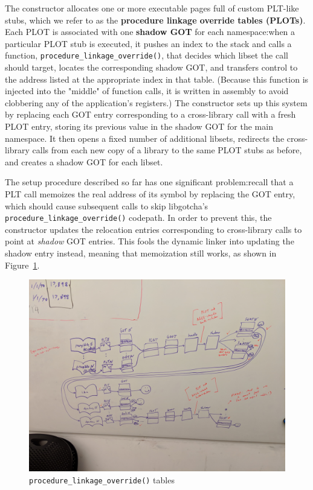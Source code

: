The constructor allocates one or more executable pages full of custom PLT-like
stubs, which we refer to as the \textbf{procedure linkage override tables (PLOTs)}.
Each PLOT is associated with one \textbf{shadow GOT} for each namespace:\@ when a
particular PLOT stub is executed, it pushes an index to the stack and calls a
function, \texttt{procedure\_linkage\_override()}, that decides which libset the call
should target, locates the corresponding shadow GOT, and transfers control to the
address listed at the appropriate index in that table.  (Because this function
is injected into the "middle" of function calls, it is written in assembly to avoid
clobbering any of the application's registers.)  The constructor sets up this system
by replacing each GOT entry corresponding to a cross-library call with a fresh PLOT
entry, storing its previous value in the shadow GOT for the main namespace.  It then
opens a fixed number of additional libsets, redirects the cross-library calls from
each new copy of a library to the same PLOT stubs as before, and creates a shadow GOT
for each libset.

The setup procedure described so far has one significant problem:\@ recall that a PLT
call memoizes the real address of its symbol by replacing the GOT entry, which should
cause subsequent calls to skip libgotcha's \texttt{procedure\_linkage\_override()}
codepath.  In order to prevent this, the constructor updates the relocation entries
corresponding to cross-library calls to point at \textit{shadow} GOT entries.  This
fools the dynamic linker into updating the shadow entry instead, meaning that
memoization still works, as shown in Figure~\ref{fig:override}.

\begin{figure}
\includegraphics[width=\columnwidth]{figs/tables}
\caption{\texttt{procedure\_linkage\_override()} tables}
\label{fig:override}
\end{figure}

